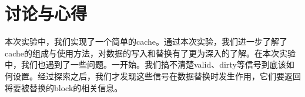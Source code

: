 \section{讨论与心得}
本次实验中，我们实现了一个简单的cache。通过本次实验，我们进一步了解了cache的组成与使用方法，对数据的写入和替换有了更为深入的了解。在本次实验中，我们也遇到了一些问题。一开始。我们搞不清楚valid、dirty等信号到底该如何设置。经过探索之后，我们才发现这些信号在数据替换时发生作用，它们要返回将要被替换的block的相关信息。